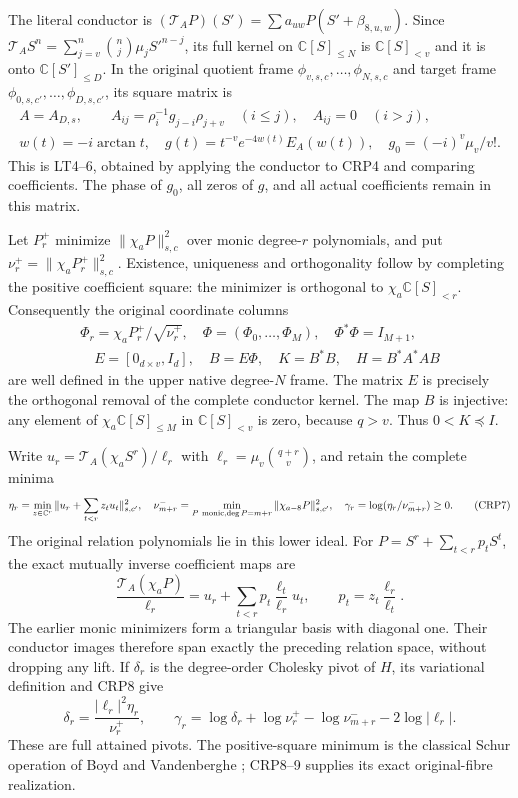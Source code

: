 The literal conductor is $(\mathcal T_AP)(S')=
\sum a_{uw}P(S'+\beta_{8,u,w})$. Since
$\mathcal T_AS^n=\sum_{j=v}^n\binom nj\mu_j S'^{n-j}$, its full
kernel on $\mathbb C[S]_{\le N}$ is $\mathbb C[S]_{<v}$ and it is
onto $\mathbb C[S']_{\le D}$. In the original quotient frame
$\phi_{v,s,c},\ldots,\phi_{N,s,c}$ and target frame
$\phi_{0,s,c'},\ldots,\phi_{D,s,c'}$, its square matrix is
\[
\begin{gathered}
A=A_{D,s},\qquad A_{ij}=\rho_i^{-1}g_{j-i}\rho_{j+v}\quad(i\le j),
\quad A_{ij}=0\quad(i>j),\\
w(t)=-i\arctan t,\quad g(t)=t^{-v}e^{-4w(t)}E_A(w(t)),
\quad g_0=(-i)^v\mu_v/v!.\tag{CRP5}
\end{gathered}
\]
This is LT4--6, obtained by applying the conductor to CRP4 and comparing
coefficients. The phase of $g_0$, all zeros of $g$, and all actual
coefficients remain in this matrix.

Let $P_r^+$ minimize $\|\chi_aP\|_{s,c}^2$ over monic degree-$r$
polynomials, and put $\nu_r^+=\|\chi_aP_r^+\|_{s,c}^2$.
Existence, uniqueness and orthogonality follow by completing the
positive coefficient square: the minimizer is orthogonal to
$\chi_a\mathbb C[S]_{<r}$. Consequently the original coordinate
columns
\[
\begin{gathered}
\Phi_r=\chi_aP_r^+/\sqrt{\nu_r^+},\quad
\Phi=(\Phi_0,\ldots,\Phi_M),\quad\Phi^*\Phi=I_{M+1},\\
\quad E=[0_{d\times v},I_d],\quad B=E\Phi,
\quad K=B^*B,\quad H=B^*A^*AB
\end{gathered}\tag{CRP6}
\]
are well defined in the upper native degree-$N$ frame. The matrix $E$
is precisely the orthogonal removal of the complete conductor kernel.
The map $B$ is injective: any element of $\chi_a\mathbb C[S]_{\le M}$
in $\mathbb C[S]_{<v}$ is zero, because $q>v$. Thus $0<K\preceq I$.

Write $u_r=\mathcal T_A(\chi_aS^r)/\ell_r$ with
$\ell_r=\mu_v\binom{q+r}{v}$, and retain the complete minima
\[
\eta_r=\min_{z\in\mathbb C^r}\|u_r+\sum_{t<r}z_tu_t\|_{s,c'}^2,
\quad\nu^-_{m+r}=\min_{P\ {\rm monic},\deg P=m+r}
 \|\chi_{a-8}P\|_{s,c'}^2,
\quad\gamma_r=\log(\eta_r/\nu^-_{m+r})\ge0.\tag{CRP7}
\]
The original relation polynomials lie in this lower ideal. For
$P=S^r+\sum_{t<r}p_tS^t$, the exact mutually inverse coefficient maps are
\[
\frac{\mathcal T_A(\chi_aP)}{\ell_r}
 =u_r+\sum_{t<r}p_t\frac{\ell_t}{\ell_r}u_t,
\qquad p_t=z_t\frac{\ell_r}{\ell_t}.\tag{CRP8}
\]
The earlier monic minimizers form a triangular basis with diagonal one.
Their conductor images therefore span exactly the preceding relation
space, without dropping any lift. If $\delta_r$ is the degree-order
Cholesky pivot of $H$, its variational definition and CRP8 give
\[
\boxed{\delta_r=\frac{|\ell_r|^2\eta_r}{\nu_r^+},\qquad
\gamma_r=\log\delta_r+\log\nu_r^+-\log\nu^-_{m+r}
                         -2\log|\ell_r|.}\tag{CRP9}
\]
These are full attained pivots. The positive-square minimum is the
classical Schur operation of Boyd and Vandenberghe
\cite[Appendix A.5.5, p.~650]{human:boyd-vandenberghe}; CRP8--9 supplies
its exact original-fibre realization.

